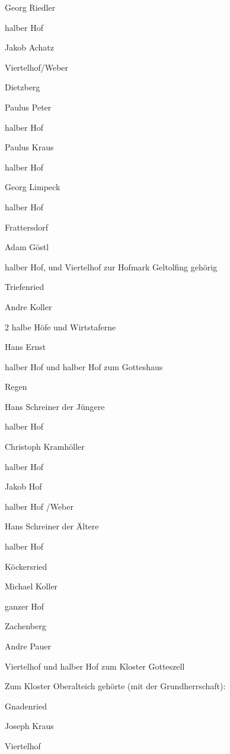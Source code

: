 \documentclass[12pt,a4pager]{book}
\begin{document}
Georg Riedler

halber Hof



Jakob Achatz

Viertelhof/Weber

Dietzberg

Paulus Peter

halber Hof



Paulus Kraus

halber Hof



Georg Limpeck

halber Hof

Frattersdorf

Adam Göstl

halber Hof, und Viertelhof zur Hofmark Geltolfing gehörig

Triefenried

Andre Koller

2 halbe Höfe und Wirtstaferne



Hans Ernst

halber Hof und halber Hof zum Gotteshaus

Regen



Hans Schreiner der Jüngere

halber Hof



Christoph Kramhöller

halber Hof



Jakob Hof

halber Hof /Weber



Hans Schreiner der Ältere

halber Hof

Köckersried

Michael Koller

ganzer Hof

Zachenberg

Andre Pauer

Viertelhof und halber Hof zum Kloster Gotteszell



Zum Kloster Oberalteich gehörte (mit der Grundherrschaft):



Gnadenried

Joseph Kraus

Viertelhof
\end{document}
